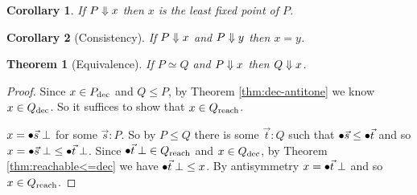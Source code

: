 \documentclass{article}
\newcommand{\fa}[1]{\forall\,{#1}.\ }
\newcommand{\N}{\mathbb{N}}
\newcommand{\todo}[1]{{\color{red}{#1}}}
\newtheorem{theorem}{Theorem}
\newtheorem{corollary}{Corollary}
\begin{document}
\begin{corollary}
  If $P \Downarrow x$ then $x$ is the least fixed point of $P$.
\end{corollary}

\begin{corollary}[Consistency]
  If $P \Downarrow x$ and $P \Downarrow y$ then $x = y$.
  \label{cor:consistency}
\end{corollary}

\todo{Couldn't I prove a perhaps more traditional ``confluence''-style theorem
  as well?}

\begin{theorem}[Equivalence]
  If $P \simeq Q$ and $P \Downarrow x$ then $Q \Downarrow x$.
  \label{thm:equivalence}
\end{theorem}

\begin{proof}
  Since $x \in {P}_{\text{dec}}$ and $Q \le P$, by Theorem \ref{thm:dec-antitone} we know
  $x \in {Q}_{\text{dec}}$. So it suffices to show that $x \in {Q}_{\text{reach}}$.

  $x = {\bullet\vec{s}}\;\bot$ for some $\vec{s} : P$. So by $P \le Q$ there is some
  $\vec{t} : Q$ such that ${\bullet\vec{s}} \le {\bullet\vec{t}}$ and so $x = {\bullet\vec{s}}\; \bot \le
  {\bullet\vec{t}}\;\bot$. Since ${\bullet\vec{t}}\;\bot \in {Q}_{\text{reach}}$ and $x \in {Q}_{\text{dec}}$, by
  Theorem \ref{thm:reachable<=dec} we have ${\bullet\vec{t}}\;\bot \le x$. By
  antisymmetry $x = {\bullet\vec{t}}\;\bot$ and so $x \in {Q}_{\text{reach}}$.
\end{proof}




\end{document}
